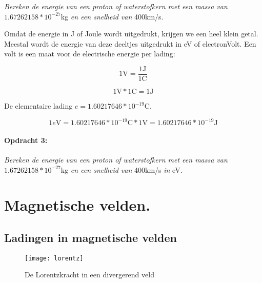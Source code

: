 \emph{Bereken de energie van een proton of waterstofkern met een massa
van} $1.67262158*10^{-27}$kg \emph{en een snelheid van} 400km/s.

Omdat de energie in J of Joule wordt uitgedrukt, krijgen we een heel
klein getal. Meestal wordt de energie van deze deeltjes uitgedrukt
in eV of electronVolt. Een volt is een maat voor de electrische energie
per lading:

\begin{equation}
1\mathrm{V}=\frac{1\mathrm{J}}{1\mathrm{C}}
\end{equation}


\begin{equation}
1\mathrm{V}*1\mathrm{C}=1\mathrm{J}
\end{equation}


De elementaire lading $e=1.60217646*10^{-19}$C. 

\begin{equation}
1e\mathrm{V}=1.60217646*10^{-19}\mathrm{C*1V}=1.60217646*10^{-19}\mathrm{J}
\end{equation}



\paragraph*{Opdracht 3:}

\emph{Bereken de energie van een proton of waterstofkern met een massa
van} $1.67262158*10^{-27}$kg \emph{en een snelheid van} 400km/s \emph{in}
eV.


\section{Magnetische velden.}


\subsection{Ladingen in magnetische velden}

\begin{figure}[h]
\noindent \begin{centering}
\texttt{[image: lorentz]}
\par\end{centering}

\caption{De Lorentzkracht in een divergerend veld}
\end{figure}


